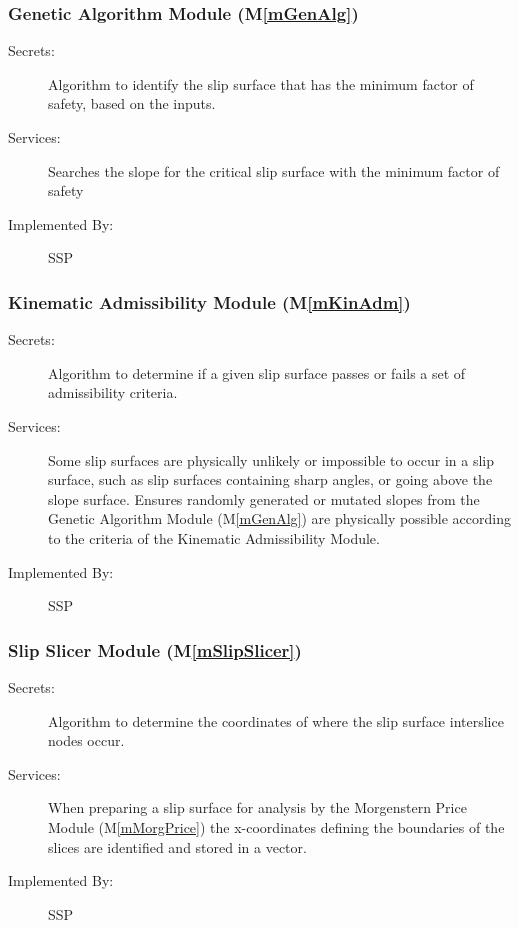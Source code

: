 \documentclass[12pt, titlepage]{article}
\newcommand{\progname}{SSP}
\newcommand{\mref}[1]{M\ref{#1}}
\begin{document}
\subsubsection{Genetic Algorithm Module (\mref{mGenAlg})}

\begin{description}
\item[Secrets:] Algorithm to identify the slip surface that has the
  minimum factor of safety, based on the inputs.
\item[Services:] Searches the slope for the critical slip surface with
  the minimum factor of safety 
\item[Implemented By:] \progname
\end{description}


\subsubsection{Kinematic Admissibility Module (\mref{mKinAdm})}

\begin{description}
\item[Secrets:] Algorithm to determine if a given slip surface passes
  or fails a set of admissibility criteria.
\item[Services:] Some slip surfaces are physically unlikely or
  impossible to occur in a slip surface, such as slip surfaces
  containing sharp angles, or going above the slope surface. Ensures
  randomly generated or mutated slopes from the Genetic Algorithm
  Module (\mref{mGenAlg}) are physically possible according to the
  criteria of the Kinematic Admissibility Module.
\item[Implemented By:] \progname
\end{description} 


\subsubsection{Slip Slicer Module (\mref{mSlipSlicer})}

\begin{description}
\item[Secrets:] Algorithm to determine the coordinates of where the
  slip surface interslice nodes occur.
\item[Services:] When preparing a slip surface for analysis by the
  Morgenstern Price Module (\mref{mMorgPrice}) the x-coordinates defining the 
  boundaries of the slices are identified and stored in a vector.
\item[Implemented By:] \progname
\end{description} 
\end{document}
